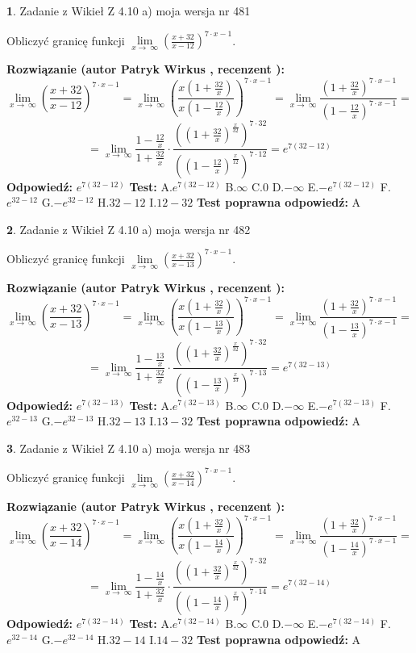 \documentclass[12pt, a4paper]{article}
\theoremstyle{definition} %
\newtheorem{zad}{}
\newcommand{\zadStart}[1]{\begin{zad}#1\newline}
\newcommand{\zadStop}{\end{zad}}
\newcommand{\rozwStart}[2]{\noindent \textbf{Rozwiązanie (autor #1 , recenzent #2): }\newline}
\newcommand{\rozwStop}{\newline}
\newcommand{\odpStart}{\noindent \textbf{Odpowiedź:}\newline}
\newcommand{\odpStop}{\newline}
\newcommand{\testStart}{\noindent \textbf{Test:}\newline}
\newcommand{\testStop}{\newline}
\newcommand{\kluczStart}{\noindent \textbf{Test poprawna odpowiedź:}\newline}
\newcommand{\kluczStop}{\newline}
\begin{document}
\zadStart{Zadanie z Wikieł Z 4.10 a) moja wersja nr 481}


Obliczyć granicę funkcji  $\lim\limits_{x\to\ \infty}(\frac{x+32}{x-12})^{7\cdot x-1}$.
\zadStop
\rozwStart{Patryk Wirkus}{}
$$\lim\limits_{x\to\ \infty}(\frac{x+32}{x-12})^{7\cdot x-1} = \lim\limits_{x\to\ \infty}(\frac{x(1+\frac{32}{x})}{x(1-\frac{12}{x})})^{7\cdot x-1}=\lim\limits_{x\to\ \infty}\frac{(1+\frac{32}{x})^{7\cdot x-1}}{(1-\frac{12}{x})^{7\cdot x-1}}=$$
$$=\lim\limits_{x\to\ \infty}\frac{1-\frac{12}{x}}{1+\frac{32}{x}}\cdot\frac{((1+\frac{32}{x})^{\frac{x}{32}})^{7\cdot32}}{((1-\frac{12}{x})^{\frac{x}{12}})^{7\cdot12}}=e^{7(32-12)}$$
\rozwStop
\odpStart
$e^{7(32-12)}$
\odpStop
\testStart
A.$e^{7(32-12)}$ B.$\infty$ C.$0$ D.$-\infty$ E.$-e^{7(32-12)}$
F.$e^{32-12}$ G.$-e^{32-12}$
H.$32-12$
I.$12-32$
\testStop
\kluczStart
A
\kluczStop



\zadStart{Zadanie z Wikieł Z 4.10 a) moja wersja nr 482}


Obliczyć granicę funkcji  $\lim\limits_{x\to\ \infty}(\frac{x+32}{x-13})^{7\cdot x-1}$.
\zadStop
\rozwStart{Patryk Wirkus}{}
$$\lim\limits_{x\to\ \infty}(\frac{x+32}{x-13})^{7\cdot x-1} = \lim\limits_{x\to\ \infty}(\frac{x(1+\frac{32}{x})}{x(1-\frac{13}{x})})^{7\cdot x-1}=\lim\limits_{x\to\ \infty}\frac{(1+\frac{32}{x})^{7\cdot x-1}}{(1-\frac{13}{x})^{7\cdot x-1}}=$$
$$=\lim\limits_{x\to\ \infty}\frac{1-\frac{13}{x}}{1+\frac{32}{x}}\cdot\frac{((1+\frac{32}{x})^{\frac{x}{32}})^{7\cdot32}}{((1-\frac{13}{x})^{\frac{x}{13}})^{7\cdot13}}=e^{7(32-13)}$$
\rozwStop
\odpStart
$e^{7(32-13)}$
\odpStop
\testStart
A.$e^{7(32-13)}$ B.$\infty$ C.$0$ D.$-\infty$ E.$-e^{7(32-13)}$
F.$e^{32-13}$ G.$-e^{32-13}$
H.$32-13$
I.$13-32$
\testStop
\kluczStart
A
\kluczStop



\zadStart{Zadanie z Wikieł Z 4.10 a) moja wersja nr 483}


Obliczyć granicę funkcji  $\lim\limits_{x\to\ \infty}(\frac{x+32}{x-14})^{7\cdot x-1}$.
\zadStop
\rozwStart{Patryk Wirkus}{}
$$\lim\limits_{x\to\ \infty}(\frac{x+32}{x-14})^{7\cdot x-1} = \lim\limits_{x\to\ \infty}(\frac{x(1+\frac{32}{x})}{x(1-\frac{14}{x})})^{7\cdot x-1}=\lim\limits_{x\to\ \infty}\frac{(1+\frac{32}{x})^{7\cdot x-1}}{(1-\frac{14}{x})^{7\cdot x-1}}=$$
$$=\lim\limits_{x\to\ \infty}\frac{1-\frac{14}{x}}{1+\frac{32}{x}}\cdot\frac{((1+\frac{32}{x})^{\frac{x}{32}})^{7\cdot32}}{((1-\frac{14}{x})^{\frac{x}{14}})^{7\cdot14}}=e^{7(32-14)}$$
\rozwStop
\odpStart
$e^{7(32-14)}$
\odpStop
\testStart
A.$e^{7(32-14)}$ B.$\infty$ C.$0$ D.$-\infty$ E.$-e^{7(32-14)}$
F.$e^{32-14}$ G.$-e^{32-14}$
H.$32-14$
I.$14-32$
\testStop
\kluczStart
A
\kluczStop
\end{document}
